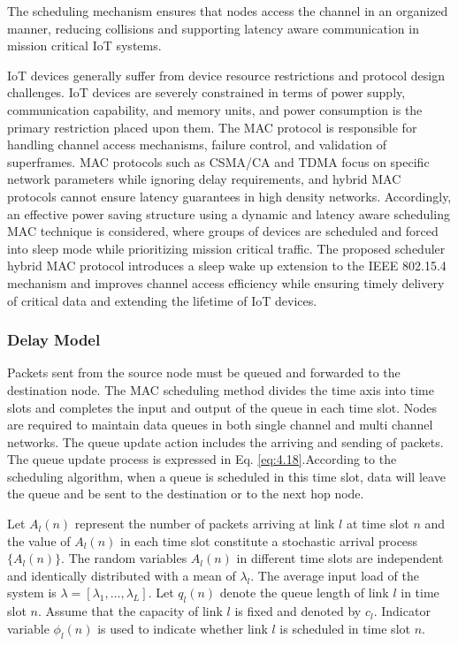 \documentclass[a4paper,fleqn]{cas-dc}
\numberwithin{equation}{section}
\begin{document}
The scheduling mechanism ensures that nodes access the channel in an organized manner, reducing collisions and supporting latency aware communication in mission critical IoT systems.


IoT devices generally suffer from device resource restrictions and protocol design challenges. IoT devices are severely constrained in terms of power supply, communication capability, and memory units, and power consumption is the primary restriction placed upon them. The MAC protocol is responsible for handling channel access mechanisms, failure control, and validation of superframes. MAC protocols such as CSMA/CA and TDMA focus on specific network parameters while ignoring delay requirements, and hybrid MAC protocols cannot ensure latency guarantees in high density networks. Accordingly, an effective power saving structure using a dynamic and latency aware scheduling MAC technique is considered, where groups of devices are scheduled and forced into sleep mode while prioritizing mission critical traffic. The proposed scheduler hybrid MAC protocol introduces a sleep wake up extension to the IEEE 802.15.4 mechanism and improves channel access efficiency while ensuring timely delivery of critical data and extending the lifetime of IoT devices.

\subsubsection{Delay Model}

Packets sent from the source node must be queued and forwarded to the destination node. The MAC scheduling method divides the time axis into time slots and completes the input and output of the queue in each time slot. Nodes are required to maintain data queues in both single channel and multi channel networks. The queue update action includes the arriving and sending of packets. The queue update process is expressed in Eq. \ref{eq:4.18}.According to the scheduling algorithm, when a queue is scheduled in this time slot, data will leave the queue and be sent to the destination or to the next hop node. 

Let $A_l(n)$ represent the number of packets arriving at link $l$ at time slot $n$ and the value of $A_l(n)$ in each time slot constitute a stochastic arrival process $\{A_l(n)\}$. The random variables $A_l(n)$ in different time slots are independent and identically distributed with a mean of $\lambda_l$. The average input load of the system is $\lambda = [\lambda_1, \ldots, \lambda_L]$. Let $q_l(n)$ denote the queue length of link $l$ in time slot $n$. Assume that the capacity of link $l$ is fixed and denoted by $c_l$. Indicator variable $\phi_l(n)$ is used to indicate whether link $l$ is scheduled in time slot $n$. 
\end{document}
